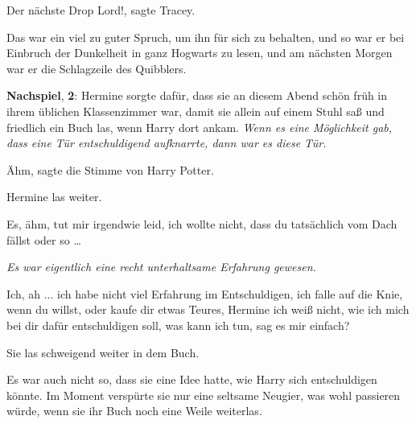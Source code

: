 \glqq{}Der nächste Drop Lord!\grqq{}, sagte Tracey.

Das war ein viel zu guter Spruch, um ihn für sich zu behalten, und so war er bei
Einbruch der Dunkelheit in ganz Hogwarts zu lesen, und am nächsten Morgen war er
die Schlagzeile des Quibblers.

\textbf{Nachspiel}, \textbf{2}: Hermine sorgte dafür, dass sie an diesem Abend
schön früh in ihrem üblichen Klassenzimmer war, damit sie allein auf einem Stuhl
saß und friedlich ein Buch las, wenn Harry dort ankam.
\emph{Wenn es eine Möglichkeit gab, dass eine Tür entschuldigend aufknarrte,
dann war es diese Tür.}

\glqq{}Ähm\grqq{}, sagte die Stimme von Harry Potter.

Hermine las weiter.

\glqq{}Es, ähm, tut mir irgendwie leid, ich wollte nicht, dass du tatsächlich vom
Dach fällst oder so …\grqq{}

\emph{Es war eigentlich eine recht unterhaltsame Erfahrung gewesen.}

\glqq{}Ich, ah ... ich habe nicht viel Erfahrung im Entschuldigen, ich falle auf
die Knie, wenn du willst, oder kaufe dir etwas Teures, Hermine ich weiß nicht,
wie ich mich bei dir dafür entschuldigen soll, was kann ich tun, sag es mir
einfach?\grqq{}

Sie las schweigend weiter in dem Buch.

Es war auch nicht so, dass sie eine Idee hatte, wie Harry sich entschuldigen
könnte. Im Moment verspürte sie nur eine seltsame Neugier, was wohl passieren
würde, wenn sie ihr Buch noch eine Weile weiterlas.

